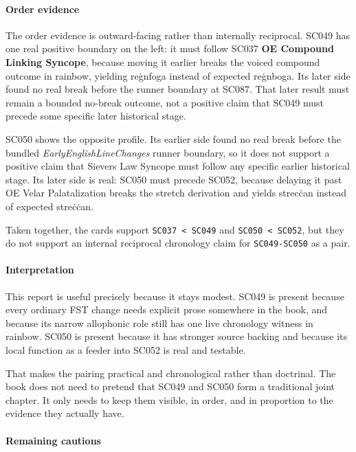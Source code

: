 \documentclass[
  british,
  a4paper,
]{article}
\begin{document}
\paragraph{Order evidence}\label{order-evidence-30}

The order evidence is outward-facing rather than internally reciprocal.
SC049 has one real positive boundary on the left: it must follow SC037
\textbf{OE Compound Linking Syncope}, because moving it earlier breaks
the voiced compound outcome in rainbow, yielding reġnfoga instead of
expected reġnboga. Its later side found no real break before the runner
boundary at SC087. That later result must remain a bounded no-break
outcome, not a positive claim that SC049 must precede some specific
later historical stage.

SC050 shows the opposite profile. Its earlier side found no real break
before the bundled \emph{EarlyEnglishLineChanges} runner boundary, so it
does not support a positive claim that Sievers Law Syncope must follow
any specific earlier historical stage. Its later side is real: SC050
must precede SC052, because delaying it past OE Velar Palatalization
breaks the stretch derivation and yields strecċan instead of expected
streċċan.

Taken together, the cards support \texttt{SC037\ \textless{}\ SC049} and
\texttt{SC050\ \textless{}\ SC052}, but they do not support an internal
reciprocal chronology claim for \texttt{SC049-SC050} as a pair.

\paragraph{Interpretation}\label{interpretation-30}

This report is useful precisely because it stays modest. SC049 is
present because every ordinary FST change needs explicit prose somewhere
in the book, and because its narrow allophonic role still has one live
chronology witness in rainbow. SC050 is present because it has stronger
source backing and because its local function as a feeder into SC052 is
real and testable.

That makes the pairing practical and chronological rather than
doctrinal. The book does not need to pretend that SC049 and SC050 form a
traditional joint chapter. It only needs to keep them visible, in order,
and in proportion to the evidence they actually have.

\paragraph{Remaining cautions}\label{remaining-cautions-30}
\end{document}
